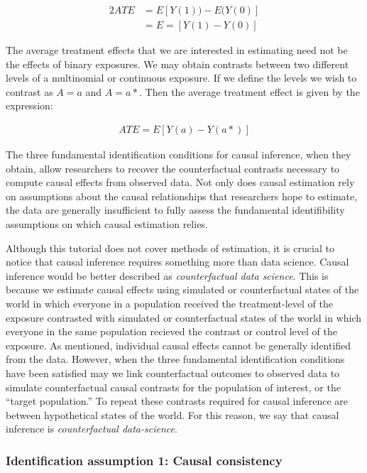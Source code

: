 \documentclass[
  singlecolumn]{report}
\begin{document}
\begin{alignat*}{2}
ATE & = E[Y(1)) - E(Y(0)]\\
& = E=[Y(1) - Y(0)]
\end{alignat*}

The average treatment effects that we are interested in estimating need
not be the effects of binary exposures. We may obtain contrasts between
two different levels of a multinomial or continuous exposure. If we
define the levels we wish to contrast as \(A = a\) and \(A = a*\). Then
the average treatment effect is given by the expression:

   \begin{align*}
    ATE = E[Y(a) - Y(a*)]
    \end{align*}

The three fundamental identification conditions for causal inference,
when they obtain, allow researchers to recover the counterfactual
contrasts necessary to compute causal effects from observed data. Not
only does causal estimation rely on assumptions about the causal
relationships that researchers hope to estimate, the data are generally
insufficient to fully assess the fundamental identifibility assumptions
on which causal estimation relies.

Although this tutorial does not cover methods of estimation, it is
crucial to notice that causal inference requires something more than
data science. Causal inference would be better described as
\emph{counterfactual data science}. This is because we estimate causal
effects using simulated or counterfactual states of the world in which
everyone in a population received the treatment-level of the exposure
contrasted with simulated or counterfactual states of the world in which
everyone in the same population recieved the contrast or control level
of the exposure. As mentioned, individual causal effects cannot be
generally identified from the data. However, when the three fundamental
identification conditions have been satisfied may we link counterfactual
outcomes to observed data to simulate counterfactual causal contrasts
for the population of interest, or the ``target population.'' To repeat
these contrasts required for causal inference are between hypothetical
states of the world. For this reason, we say that causal inference is
\emph{counterfactual data-science}.

\hypertarget{identification-assumption-1-causal-consistency}{%
\subsubsection{Identification assumption 1: Causal
consistency}\label{identification-assumption-1-causal-consistency}}
\end{document}
